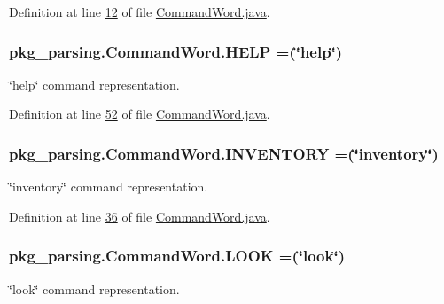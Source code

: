 Definition at line \hyperlink{CommandWord_8java_source_l00012}{12} of file \hyperlink{CommandWord_8java_source}{Command\-Word.\-java}.

\hypertarget{enumpkg__parsing_1_1CommandWord_ace035a3a624f4247b9f38c24eabe3f91}{
\subsubsection[{H\-E\-L\-P}]{\setlength{\rightskip}{0pt plus 5cm}pkg\-\_\-parsing.\-Command\-Word.\-H\-E\-L\-P =(\char`\"{}help\char`\"{})}}\label{enumpkg__parsing_1_1CommandWord_ace035a3a624f4247b9f38c24eabe3f91}
\char`\"{}help\char`\"{} command representation. 

Definition at line \hyperlink{CommandWord_8java_source_l00052}{52} of file \hyperlink{CommandWord_8java_source}{Command\-Word.\-java}.

\hypertarget{enumpkg__parsing_1_1CommandWord_a3dace936c35682fe74dad6714af270e4}{
\subsubsection[{I\-N\-V\-E\-N\-T\-O\-R\-Y}]{\setlength{\rightskip}{0pt plus 5cm}pkg\-\_\-parsing.\-Command\-Word.\-I\-N\-V\-E\-N\-T\-O\-R\-Y =(\char`\"{}inventory\char`\"{})}}\label{enumpkg__parsing_1_1CommandWord_a3dace936c35682fe74dad6714af270e4}
\char`\"{}inventory\char`\"{} command representation. 

Definition at line \hyperlink{CommandWord_8java_source_l00036}{36} of file \hyperlink{CommandWord_8java_source}{Command\-Word.\-java}.

\hypertarget{enumpkg__parsing_1_1CommandWord_a56f571b76d6ef6d6c64f9b2081b53e86}{
\subsubsection[{L\-O\-O\-K}]{\setlength{\rightskip}{0pt plus 5cm}pkg\-\_\-parsing.\-Command\-Word.\-L\-O\-O\-K =(\char`\"{}look\char`\"{})}}\label{enumpkg__parsing_1_1CommandWord_a56f571b76d6ef6d6c64f9b2081b53e86}
\char`\"{}look\char`\"{} command representation. 

